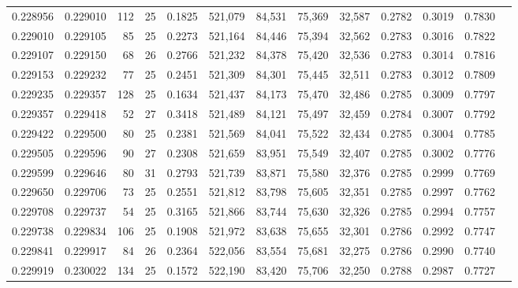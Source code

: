 \begin{tabular}{rrrrrrrrrrrrr}
0.228956 & 0.229010 & 112 &  25 &                                     0.1825 & 521,079 &  84,531 &  75,369 &  32,587 & 0.2782 & 0.3019 & 0.7830 \\
0.229010 & 0.229105 &  85 &  25 &                                     0.2273 & 521,164 &  84,446 &  75,394 &  32,562 & 0.2783 & 0.3016 & 0.7822 \\
0.229107 & 0.229150 &  68 &  26 &                                     0.2766 & 521,232 &  84,378 &  75,420 &  32,536 & 0.2783 & 0.3014 & 0.7816 \\
0.229153 & 0.229232 &  77 &  25 &                                     0.2451 & 521,309 &  84,301 &  75,445 &  32,511 & 0.2783 & 0.3012 & 0.7809 \\
0.229235 & 0.229357 & 128 &  25 &                                     0.1634 & 521,437 &  84,173 &  75,470 &  32,486 & 0.2785 & 0.3009 & 0.7797 \\
0.229357 & 0.229418 &  52 &  27 &                                     0.3418 & 521,489 &  84,121 &  75,497 &  32,459 & 0.2784 & 0.3007 & 0.7792 \\
0.229422 & 0.229500 &  80 &  25 &                                     0.2381 & 521,569 &  84,041 &  75,522 &  32,434 & 0.2785 & 0.3004 & 0.7785 \\
0.229505 & 0.229596 &  90 &  27 &                                     0.2308 & 521,659 &  83,951 &  75,549 &  32,407 & 0.2785 & 0.3002 & 0.7776 \\
0.229599 & 0.229646 &  80 &  31 &                                     0.2793 & 521,739 &  83,871 &  75,580 &  32,376 & 0.2785 & 0.2999 & 0.7769 \\
0.229650 & 0.229706 &  73 &  25 &                                     0.2551 & 521,812 &  83,798 &  75,605 &  32,351 & 0.2785 & 0.2997 & 0.7762 \\
0.229708 & 0.229737 &  54 &  25 &                                     0.3165 & 521,866 &  83,744 &  75,630 &  32,326 & 0.2785 & 0.2994 & 0.7757 \\
0.229738 & 0.229834 & 106 &  25 &                                     0.1908 & 521,972 &  83,638 &  75,655 &  32,301 & 0.2786 & 0.2992 & 0.7747 \\
0.229841 & 0.229917 &  84 &  26 &                                     0.2364 & 522,056 &  83,554 &  75,681 &  32,275 & 0.2786 & 0.2990 & 0.7740 \\
0.229919 & 0.230022 & 134 &  25 &                                     0.1572 & 522,190 &  83,420 &  75,706 &  32,250 & 0.2788 & 0.2987 & 0.7727 \\

\end{tabular}
